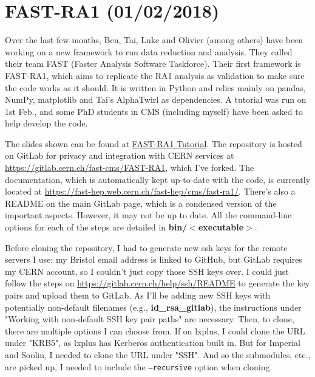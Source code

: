 
\chapter{FAST-RA1 (01/02/2018)}
\label{sec:fast-ra1}

Over the last few months, Ben, Tai, Luke and Olivier (among others) have been working on a new framework to run data reduction and analysis. They called their team FAST (Faster Analysis Software Taskforce). Their first framework is FAST-RA1, which aims to replicate the RA1 analysis as validation to make sure the code works as it should. It is written in Python and relies mainly on pandas, NumPy, matplotlib and Tai's AlphaTwirl as dependencies. A tutorial was run on 1st Feb., and some PhD students in CMS (including myself) have been asked to help develop the code.

The slides shown can be found at \href{run:modules/Sec 36 - FAST-RA1/figures/FAST-RA1 Tutorial.pdf}{FAST-RA1 Tutorial}. The repository is hosted on GitLab for privacy and integration with CERN services at \url{https://gitlab.cern.ch/fast-cms/FAST-RA1}, which I've forked. The documentation, which is automatically kept up-to-date with the code, is currently located at \url{https://fast-hep.web.cern.ch/fast-hep/cms/fast-ra1/}. There's also a README on the main GitLab page, which is a condensed version of the important aspects. However, it may not be up to date. All the command-line options for each of the steps are detailed in \textbf{bin/$<$executable$>$}. 

Before cloning the repository, I had to generate new ssh keys for the remote servers I use; my Bristol email address is linked to GitHub, but GitLab requires my CERN account, so I couldn't just copy those SSH keys over. I could just follow the steps on \url{https://gitlab.cern.ch/help/ssh/README} to generate the key pairs and upload them to GitLab. As I'll be adding new SSH keys with potentially non-default filenames (e.g., \textbf{id\_rsa\_gitlab}), the instructions under "Working with non-default SSH key pair paths" are necessary. Then, to clone, there are multiple options I can choose from. If on lxplus, I could clone the URL under "KRB5", as lxplus has Kerberos authentication built in. But for Imperial and Soolin, I needed to clone the URL under "SSH". And so the submodules, etc., are picked up, I needed to include the \texttt{--recursive} option when cloning.

